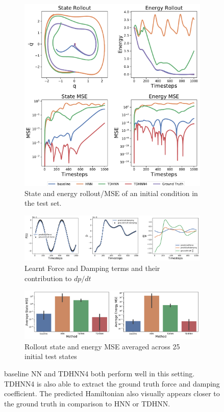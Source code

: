 \documentclass[twoside]{article}
\begin{document}
\begin{figure}[h!]
\centering
\captionsetup{justification=centering}
	\begin{subfigure}[b]{0.4\textwidth}
		\centering
		\includegraphics[width=\textwidth]{figures/duffing_state.pdf}
		\caption{State and energy rollout/MSE of an initial condition in the test set.}
	\end{subfigure}
	\begin{subfigure}[b]{0.48\textwidth}
		\centering
		\includegraphics[width=\textwidth]{figures/dpdt_duffing.pdf}
		\caption{Learnt Force and Damping terms and their contribution to $dp/dt$}
	\end{subfigure}
	\begin{subfigure}[b]{0.48\textwidth}
	    \centering
		\includegraphics[width=\textwidth]{figures/duffing_errors.pdf}
		\caption{Rollout state and energy MSE averaged across 25 initial test states}
	\end{subfigure}
\caption{baseline NN and TDHNN4 both perform well in this setting. TDHNN4 is also able to extract the ground truth force and damping coefficient. The predicted Hamiltonian also visually appears closer to the ground truth in comparison to HNN or TDHNN.}
\end{figure}
\end{document}
